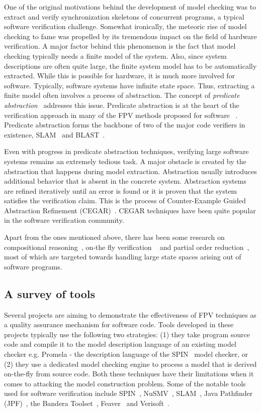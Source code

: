 \noindent
One of the original motivations behind the development of model 
checking was to extract and verify synchronization skeletons of concurrent 
programs, a typical software verification challenge. Somewhat ironically, 
the meteoric rise of model checking to fame was propelled by its 
tremendous impact on the field of hardware verification. A major factor 
behind this phenomenon is the fact that model checking typically needs 
a finite model of the system. Also, since system descriptions are 
often quite large, the finite system model has to be automatically 
extracted. While this is possible for hardware, it is much more involved 
for software. Typically, software systems have infinite state space. Thus, 
extracting a finite model often involves a process of abstraction. 
The concept of {\em predicate abstraction}~\cite{ball:01, graf:97}
addresses this issue. Predicate abstraction is at the heart of the 
verification approach in many of the FPV methods proposed for software 
~\cite{dill:89, LTSA}. Predicate abstraction forms the 
backbone of two of the major code verifiers in existence, SLAM~\cite{slam} 
and BLAST~\cite{blast}. 

\noindent
Even with progress in predicate abstraction techniques, verifying large 
software systems remains an extremely tedious task.
A major obstacle is created by the abstraction that happens during 
model extraction. Abstraction usually introduces additional behavior 
that is absent in the concrete system. Abstraction systems are refined 
iteratively until an error is found or it is proven that the system 
satisfies the verification claim. This is the process of Counter-Example 
Guided Abstraction Refinement (CEGAR)~\cite{clarke:00b}. CEGAR techniques 
have been quite popular in the software verification community. 

\noindent
Apart from the ones mentioned above, there has been some research on 
compositional reasoning~\cite{clarke:92}, on-the fly verification
~\cite{peled:94} and partial order reduction~\cite{holzmann:94}, most of which 
are targeted towards handling large state spaces arising out of software 
programs.

\subsection{A survey of tools}
Several projects are aiming to demonstrate the effectiveness of FPV 
techniques as a quality assurance mechanism for software code. Tools developed 
in these projects typically use the following two strategies:
(1) they take program source code and compile it to the model description 
language of an existing model checker e.g. Promela - the description 
language of the SPIN~\cite{spin} model checker, or (2) they use a dedicated 
model checking engine to process a model that is derived on-the-fly from 
source code. Both these techniques have their limitations when it comes 
to attacking the model construction problem. Some of the notable tools 
used for software verification include SPIN~\cite{spin}, NuSMV~\cite{nusmv}, 
SLAM~\cite{slam}, Java Pathfinder (JPF)~\cite{jpf}, the Bandera
Toolset~\cite{bandera}, Feaver~\cite{feaver} and Verisoft~\cite{verisoft}.

